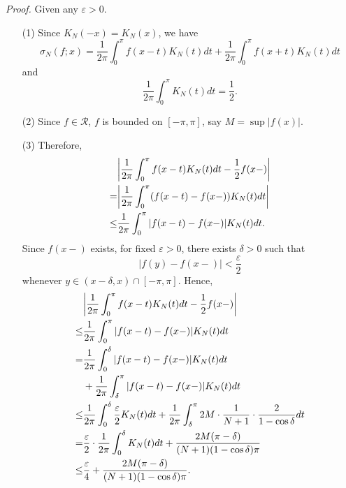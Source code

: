 \documentclass{article}
\begin{document}
\emph{Proof.}
Given any $\varepsilon > 0$.
\begin{enumerate}
\item[(1)]
Since $K_N(-x) = K_N(x)$, we have
\[
  \sigma_N(f;x)
  = \frac{1}{2\pi} \int_{0}^{\pi} f(x-t)K_N(t)dt
    + \frac{1}{2\pi} \int_{0}^{\pi} f(x+t)K_N(t)dt
\]
and
\[
  \frac{1}{2\pi} \int_{0}^{\pi} K_N(t)dt = \frac{1}{2}.
\]

\item[(2)]
Since $f \in \mathscr{R}$,
$f$ is bounded on $[-\pi,\pi]$, say $M = \sup|f(x)|$.

\item[(3)]
Therefore,
  \begin{align*}
    &\abs{ \frac{1}{2\pi} \int_{0}^{\pi} f(x-t)K_N(t)dt - \frac{1}{2} f(x-) } \\
    =& \abs{ \frac{1}{2\pi} \int_{0}^{\pi} (f(x-t)-f(x-))K_N(t)dt } \\
    \leq& \frac{1}{2\pi} \int_{0}^{\pi} |f(x-t)-f(x-)|K_N(t)dt.
  \end{align*}
Since $f(x-)$ exists,
for fixed $\varepsilon > 0$, there exists $\delta > 0$
such that
\[
  |f(y) - f(x-)| < \frac{\varepsilon}{2}
\]
whenever $y \in (x-\delta,x) \cap [-\pi,\pi]$.
Hence,
  \begin{align*}
    &\abs{ \frac{1}{2\pi} \int_{0}^{\pi} f(x-t)K_N(t)dt - \frac{1}{2} f(x-) } \\
    \leq& \frac{1}{2\pi} \int_{0}^{\pi} |f(x-t)-f(x-)|K_N(t)dt \\
    =& \frac{1}{2\pi} \int_{0}^{\delta} |f(x-t)-f(x-)|K_N(t)dt \\
      &+ \frac{1}{2\pi} \int_{\delta}^{\pi} |f(x-t)-f(x-)|K_N(t)dt \\
    \leq& \frac{1}{2\pi} \int_{0}^{\delta} \frac{\varepsilon}{2} K_N(t)dt
      + \frac{1}{2\pi} \int_{\delta}^{\pi} 2M \cdot \frac{1}{N+1} \cdot \frac{2}{1-\cos \delta} dt \\
    =& \frac{\varepsilon}{2} \cdot \frac{1}{2\pi} \int_{0}^{\delta} K_N(t)dt
      + \frac{2M(\pi-\delta)}{(N+1)(1-\cos \delta)\pi} \\
    \leq& \frac{\varepsilon}{4} + \frac{2M(\pi-\delta)}{(N+1)(1-\cos \delta)\pi}. \\
  \end{align*}


\end{enumerate}
\end{document}
